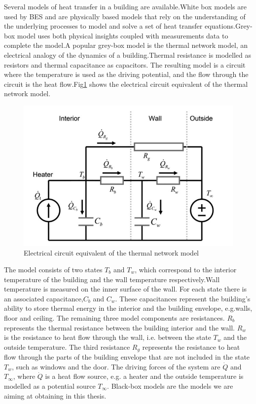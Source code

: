 \documentclass[a4paper,12pt]{report}
\numberwithin{equation}{section}
\begin{document}
Several models of heat transfer in a building are available.White box models are used by BES and are physically based models that rely on the understanding of the underlying processes to model and solve a set of heat transfer equations.Grey-box model uses both physical insights coupled with measurements data to complete the model.A popular grey-box model is the thermal network model, an electrical analogy of the dynamics of a building.Thermal resistance is modelled as resistors and
thermal capacitance as capacitors. The resulting model is a circuit where the temperature is used as the driving potential, and the flow through the circuit is the heat    flow.Fig\ref{fig:thermalmodel} shows the electrical circuit equivalent  of the thermal network model.


\begin{figure}[H]
    \includegraphics[scale=0.5]{thermal.JPG}
    \centering
    \caption{Electrical circuit equivalent  of the thermal network model}
    \label{fig:thermalmodel}
\end{figure}

\noindent
The model consists of two states $T_{b}$ and $T_{w}$, which correspond to the interior temperature of the building and the wall temperature respectively.Wall temperature is measured on the inner surface of the wall. For each state there is an associated capacitance,$C_{b}$ and $C_{w}$. These capacitances represent the building’s ability to store thermal energy in the interior and the building envelope, e.g.walls, floor and ceiling. The remaining three model components are resistances. $R_{b}$ represents the thermal resistance between the building interior and the wall. $R_{w}$ is the resistance to heat flow through the wall, i.e. between the state $T_{w}$ and the outside temperature. The third resistance $R_{g}$ represents the resistance to heat flow through the parts of the building envelope that are not included in the state $T_{w}$, such as windows and the door. The driving forces of the system are $\dot{Q}$ and $T_{\infty}$, where $\dot{Q}$ is a heat flow source, e.g. a heater and the outside temperature is modelled as a potential source $T_{\infty}$. Black-box models are the models we are aiming at obtaining in this thesis.
\end{document}
